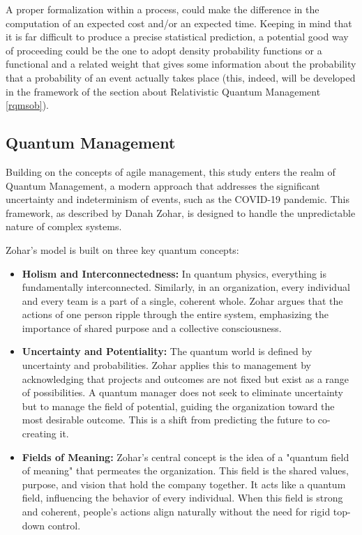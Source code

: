 \documentclass{article}
\begin{document}
A proper formalization within a process, could make the difference in the computation of an expected cost and/or an expected time. Keeping in mind that it is far difficult to produce a precise statistical prediction, a potential good way of proceeding could be the one to adopt density probability functions or a functional and a related weight that gives some information about the probability that a probability of an event actually takes place (this, indeed, will be developed in the framework of the section about Relativistic Quantum Management \ref{rqmsob}).
\newpage
\subsection{Quantum Management}
Building on the concepts of agile management, this study enters the realm of Quantum Management, a modern approach that addresses the significant uncertainty and indeterminism of events, such as the COVID-19 pandemic. This framework, as described by Danah Zohar, is designed to handle the unpredictable nature of complex systems. 

Zohar's model is built on three key quantum concepts:

\begin{itemize}
    \item \textbf{Holism and Interconnectedness:} In quantum physics, everything is fundamentally interconnected. Similarly, in an organization, every individual and every team is a part of a single, coherent whole. Zohar argues that the actions of one person ripple through the entire system, emphasizing the importance of shared purpose and a collective consciousness.
    \item \textbf{Uncertainty and Potentiality:} The quantum world is defined by uncertainty and probabilities. Zohar applies this to management by acknowledging that projects and outcomes are not fixed but exist as a range of possibilities. A quantum manager does not seek to eliminate uncertainty but to manage the field of potential, guiding the organization toward the most desirable outcome. This is a shift from predicting the future to co-creating it.
    \item \textbf{Fields of Meaning:} Zohar's central concept is the idea of a "quantum field of meaning" that permeates the organization. This field is the shared values, purpose, and vision that hold the company together. It acts like a quantum field, influencing the behavior of every individual. When this field is strong and coherent, people's actions align naturally without the need for rigid top-down control.
\end{itemize}
\end{document}

